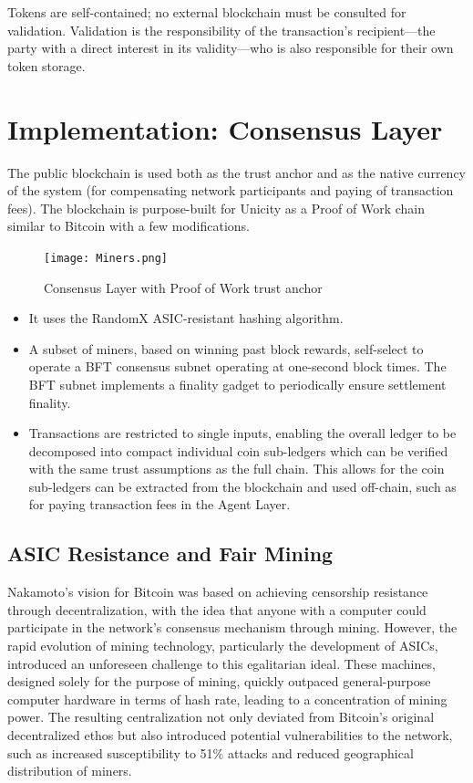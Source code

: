 \documentclass{article}
\begin{document}
Tokens are self-contained; no external blockchain must be consulted for validation. Validation is the responsibility of the transaction's recipient---the party with a direct interest in its validity---who is also responsible for their own token storage.


\section{Implementation: Consensus Layer}

The public blockchain is used both as the trust anchor and as the native currency of the system (for compensating network participants and paying of transaction fees). The blockchain is purpose-built for Unicity as a Proof of Work chain similar to Bitcoin with a few modifications.

\begin{figure}[htbp]
    \centering
    \texttt{[image: Miners.png]}
    \caption{Consensus Layer with Proof of Work trust anchor}
    \label{fig:miners}
\end{figure}

\begin{itemize}
\setlength{\leftmargin}{1em}
 \item It uses the RandomX ASIC-resistant hashing algorithm.
 \item A subset of miners, based on winning past block rewards, self-select to operate a BFT consensus subnet operating at one-second block times. The BFT subnet implements a finality gadget to periodically ensure settlement finality.
 \item Transactions are restricted to single inputs, enabling the overall ledger to be decomposed into compact individual coin sub-ledgers which can be verified with the same trust assumptions as the full chain.  This allows for the coin sub-ledgers can be extracted from the blockchain and used off-chain, such as for paying transaction fees in the Agent Layer.
\end{itemize}

\subsection{ASIC Resistance and Fair Mining}

Nakamoto's vision for Bitcoin was based on achieving censorship resistance through decentralization, with the idea that anyone with a computer could participate in the network's consensus mechanism through mining. However, the rapid evolution of mining technology, particularly the development of ASICs, introduced an unforeseen challenge to this egalitarian ideal. These machines, designed solely for the purpose of mining, quickly outpaced general-purpose computer hardware in terms of hash rate, leading to a concentration of mining power. The resulting centralization not only deviated from Bitcoin's original decentralized ethos but also introduced potential vulnerabilities to the network, such as increased susceptibility to 51\% attacks and reduced geographical distribution of miners.
\end{document}
